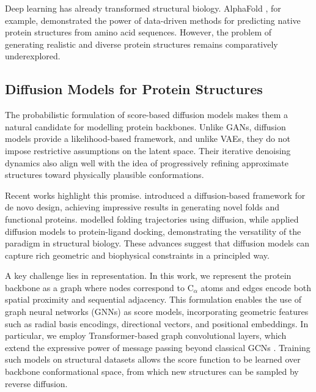 \documentclass[a4paper,12pt]{article}
\begin{document}
Deep learning has already transformed structural biology. AlphaFold \citep{jumper2021HighlyAccurateProtein}, for example, demonstrated the power of data-driven methods for predicting native protein structures from amino acid sequences. However, the problem of generating realistic and diverse protein structures remains comparatively underexplored.

\subsection{Diffusion Models for Protein Structures}
The probabilistic formulation of score-based diffusion models makes them a natural candidate for modelling protein backbones. Unlike GANs, diffusion models provide a likelihood-based framework, and unlike VAEs, they do not impose restrictive assumptions on the latent space. Their iterative denoising dynamics also align well with the idea of progressively refining approximate structures toward physically plausible conformations.

Recent works highlight this promise. \citet{watsonNovoDesignProtein2023} introduced a diffusion-based framework for de novo design, achieving impressive results in generating novel folds and functional proteins. \citet{wuProteinStructureGeneration2024} modelled folding trajectories using diffusion, while \citet{yimDiffusionModelsProtein2024} applied diffusion models to protein-ligand docking, demonstrating the versatility of the paradigm in structural biology. These advances suggest that diffusion models can capture rich geometric and biophysical constraints in a principled way.

A key challenge lies in representation. In this work, we represent the protein backbone as a graph where nodes correspond to C\(_\alpha\) atoms and edges encode both spatial proximity and sequential adjacency. This formulation enables the use of graph neural networks (GNNs) \citep{scarselliGraphNeuralNetwork2009,gilmer2017NeuralMessagePassing} as score models, incorporating geometric features such as radial basis encodings, directional vectors, and positional embeddings. In particular, we employ Transformer-based graph convolutional layers, which extend the expressive power of message passing beyond classical GCNs \citep{kipf2017SemiSupervisedClassificationGraph}. Training such models on structural datasets allows the score function to be learned over backbone conformational space, from which new structures can be sampled by reverse diffusion.
\end{document}
